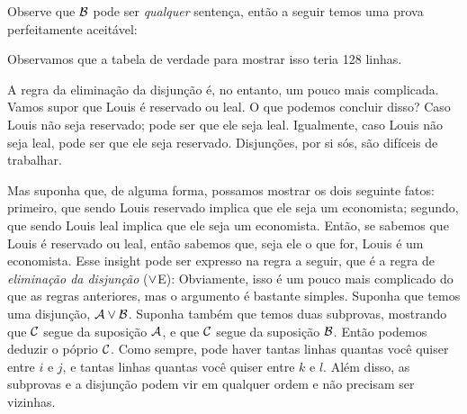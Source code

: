  

Observe que $\mathcal{B}$ pode ser \emph{qualquer} sentença, então a seguir temos uma prova perfeitamente aceit\' avel: 
\begin{fitchproof}
\end{fitchproof}


Observamos que a tabela de verdade para mostrar isso teria 128 linhas.

A regra da eliminação da disjunção é, no entanto, um pouco mais complicada. Vamos supor que  Louis é reservado ou leal.  O que podemos concluir disso? Caso  Louis  não seja reservado; pode ser que ele seja leal.   Igualmente, caso  Louis  não seja leal, pode ser que ele seja reservado.  Disjunções, por si sós, são difíceis de trabalhar.

Mas suponha que, de alguma forma, possamos mostrar os dois seguinte fatos: primeiro, que sendo Louis reservado implica que ele seja um economista; segundo, que sendo Louis leal implica que ele seja um economista.
Então, se sabemos que Louis é reservado ou leal, então sabemos que, seja ele o que for, Louis é um economista.   Esse insight pode ser expresso na regra a seguir, que é a regra de \textit{eliminação da disjunção}  ($\vee$E):
Obviamente, isso é um pouco mais complicado do que as regras anteriores, mas o argumento é bastante simples. Suponha que temos uma disjunção, $\mathcal{A} \vee \mathcal{B}$. Suponha também que temos duas subprovas, mostrando que $\mathcal{C}$ segue da suposição $\mathcal{A}$, e que $\mathcal{C}$ segue da suposição $\mathcal{B}$. Então podemos deduzir o póprio $\mathcal{C}$. 
 Como sempre, pode haver  tantas linhas quantas  você quiser entre   $i$ e $j$,   e tantas linhas quantas você quiser entre $k$ e $l$. Além disso, as subprovas e a disjunção podem vir em qualquer ordem e não precisam ser vizinhas.

